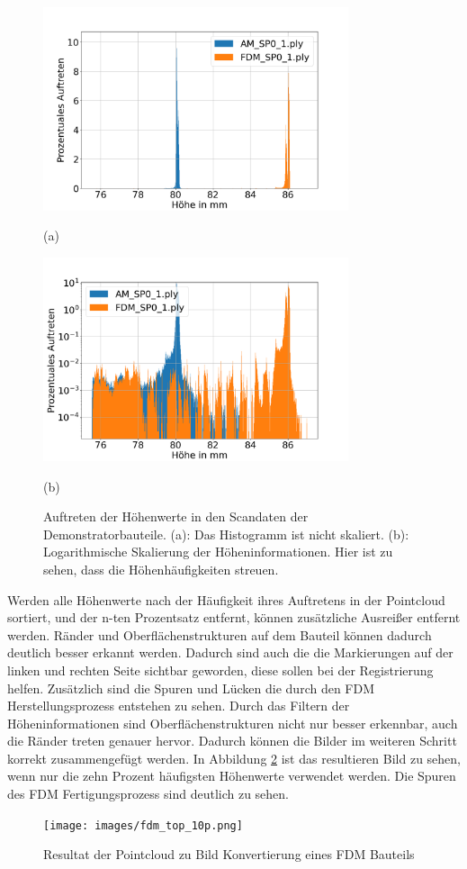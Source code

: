 \begin{figure}[H]
    \centering
    \begin{minipage}{\textwidth}
        \centering
        \includegraphics[width=0.8\textwidth]{images/height_occurange.png} %
        \caption*{(a)}
    \end{minipage}\hfill
    \begin{minipage}{\textwidth}
        \centering
        \includegraphics[width=0.8\textwidth]{images/height_occurange_log.png} %
        \caption*{(b)}
    \end{minipage}
    \caption{Auftreten der Höhenwerte in den Scandaten der Demonstratorbauteile. 
    (a): Das Histogramm ist nicht skaliert. (b): Logarithmische Skalierung der 
    Höheninformationen. Hier ist zu sehen, dass die Höhenhäufigkeiten streuen.}
    \label{fig:brightness}
\end{figure}

Werden alle Höhenwerte nach der Häufigkeit ihres 
Auftretens in der Pointcloud sortiert, und der n-ten Prozentsatz entfernt, können
zusätzliche Ausreißer entfernt werden.
Ränder und Oberflächenstrukturen auf dem Bauteil können dadurch deutlich besser erkannt werden. 
Dadurch sind auch die die Markierungen auf der linken und rechten Seite sichtbar geworden,
diese sollen bei der Registrierung
helfen. Zusätzlich sind die Spuren und Lücken die durch den FDM 
Herstellungsprozess entstehen zu sehen.
Durch das Filtern der Höheninformationen sind Oberflächenstrukturen nicht nur besser
erkennbar, auch die Ränder treten genauer hervor. 
Dadurch können die Bilder im weiteren Schritt korrekt zusammengefügt werden.
In Abbildung \ref{fig:10p} ist das resultieren Bild zu sehen, wenn nur die zehn Prozent
häufigsten Höhenwerte verwendet werden.
Die Spuren des FDM Fertigungsprozess sind deutlich zu sehen.

\begin{figure}[H]
    \centering
    \texttt{[image: images/fdm\_top\_10p.png]}
    \caption{Resultat der Pointcloud zu Bild Konvertierung eines FDM Bauteils}
    \label{fig:10p}
\end{figure}
